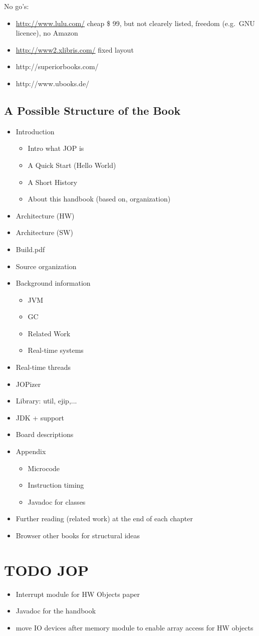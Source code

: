 No go's:
\begin{itemize}
    \item \url{http://www.lulu.com/} cheap \$ 99, but not clearely
    listed, freedom (e.g.\ GNU licence), no Amazon
    \item \url{http://www2.xlibris.com/} fixed layout
    \item http://superiorbooks.com/
    \item http://www.ubooks.de/
\end{itemize}
\subsection{A Possible Structure of the Book}

\begin{itemize}
    \item Introduction
    \begin{itemize}
        \item Intro what JOP is
        \item A Quick Start (Hello World)
        \item A Short History
        \item About this handbook (based on, organization)
    \end{itemize}
    \item Architecture (HW)
    \item Architecture (SW)
    \item Build.pdf
    \item Source organization
    \item Background information
    \begin{itemize}
        \item JVM
        \item GC
        \item Related Work
        \item Real-time systems
    \end{itemize}
    \item Real-time threads
    \item JOPizer
    \item Library: util, ejip,...
    \item JDK + support
    \item Board descriptions
    \item Appendix
    \begin{itemize}
        \item Microcode
        \item Instruction timing
        \item Javadoc for classes
    \end{itemize}
    \item Further reading (related work) at the end of each chapter
    \item Browser other books for structural ideas
\end{itemize}

\section{TODO JOP}

\begin{itemize}
    \item Interrupt module for HW Objects paper
    \item Javadoc for the handbook
    \item move IO devices after memory module to enable array access
    for HW objects
\end{itemize}
